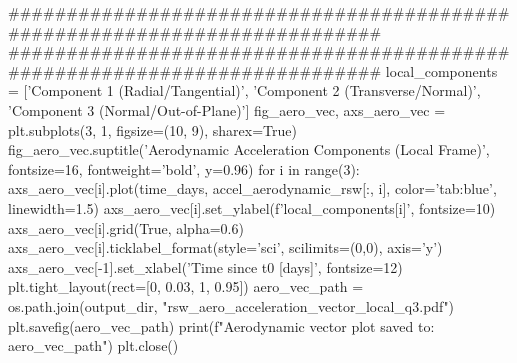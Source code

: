 {}
\markdownRendererSectionEnd \markdownRendererSectionBegin
{}\markdownRendererInterblockSeparator
{}###########################################################################\markdownRendererInterblockSeparator
{}
\markdownRendererSectionEnd \markdownRendererSectionBegin
{}\markdownRendererInterblockSeparator
{}###########################################################################\markdownRendererInterblockSeparator
{}
\markdownRendererSectionEnd \markdownRendererSectionBegin
{}\markdownRendererInterblockSeparator
{}local_components = ['Component 1 (Radial/Tangential)', 'Component 2 (Transverse/Normal)', 'Component 3 (Normal/Out-of-Plane)']\markdownRendererInterblockSeparator
{}
\markdownRendererSectionEnd \markdownRendererSectionBegin
\markdownRendererHeadingOne{-------------------------------------------------------------------------}\markdownRendererInterblockSeparator
{}
\markdownRendererSectionEnd \markdownRendererSectionBegin
{}\markdownRendererInterblockSeparator
{}
\markdownRendererSectionEnd \markdownRendererSectionBegin
\markdownRendererHeadingOne{-------------------------------------------------------------------------}\markdownRendererInterblockSeparator
{}fig_aero_vec, axs_aero_vec = plt.subplots(3, 1, figsize=(10, 9), sharex=True) fig_aero_vec.suptitle('Aerodynamic Acceleration Components (Local Frame)', fontsize=16, fontweight='bold', y=0.96) for i in range(3): axs_aero_vec[i].plot(time_days, accel_aerodynamic_rsw[:, i], color='tab:blue', linewidth=1.5) axs_aero_vec[i].set_ylabel(f'{local_components[i]}\n[m/s²]', fontsize=10) axs_aero_vec[i].grid(True, alpha=0.6) axs_aero_vec[i].ticklabel_format(style='sci', scilimits=(0,0), axis='y') axs_aero_vec[-1].set_xlabel('Time since t0 [days]', fontsize=12) plt.tight_layout(rect=[0, 0.03, 1, 0.95]) aero_vec_path = os.path.join(output_dir, "rsw_aero_acceleration_vector_local_q3.pdf") plt.savefig(aero_vec_path) print(f"Aerodynamic vector plot saved to: {aero_vec_path}") plt.close()\markdownRendererInterblockSeparator
{}
\markdownRendererSectionEnd \markdownRendererSectionBegin
\markdownRendererHeadingOne{-------------------------------------------------------------------------}\markdownRendererInterblockSeparator
{}
\markdownRendererSectionEnd \markdownRendererSectionBegin
